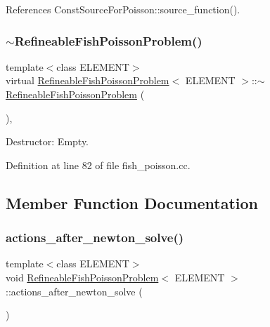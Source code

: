 References Const\+Source\+For\+Poisson\+::source\+\_\+function().

\mbox{\label{classRefineableFishPoissonProblem_a4a5e7c5f264364211ad641353933c222}} 
\subsubsection{\texorpdfstring{$\sim$\+Refineable\+Fish\+Poisson\+Problem()}{~RefineableFishPoissonProblem()}}
{\footnotesize\ttfamily template$<$class E\+L\+E\+M\+E\+NT$>$ \\
virtual \hyperlink{classRefineableFishPoissonProblem}{Refineable\+Fish\+Poisson\+Problem}$<$ E\+L\+E\+M\+E\+NT $>$\+::$\sim$\hyperlink{classRefineableFishPoissonProblem}{Refineable\+Fish\+Poisson\+Problem} (\begin{DoxyParamCaption}{ }\end{DoxyParamCaption})\hspace{0.3cm}{\ttfamily [inline]}, {\ttfamily [virtual]}}



Destructor\+: Empty. 



Definition at line 82 of file fish\+\_\+poisson.\+cc.



\subsection{Member Function Documentation}
\mbox{\label{classRefineableFishPoissonProblem_a7f6c356f7c8bd0130de957297e999f40}} 
\subsubsection{\texorpdfstring{actions\+\_\+after\+\_\+newton\+\_\+solve()}{actions\_after\_newton\_solve()}}
{\footnotesize\ttfamily template$<$class E\+L\+E\+M\+E\+NT$>$ \\
void \hyperlink{classRefineableFishPoissonProblem}{Refineable\+Fish\+Poisson\+Problem}$<$ E\+L\+E\+M\+E\+NT $>$\+::actions\+\_\+after\+\_\+newton\+\_\+solve (\begin{DoxyParamCaption}{ }\end{DoxyParamCaption})\hspace{0.3cm}{\ttfamily [inline]}}




